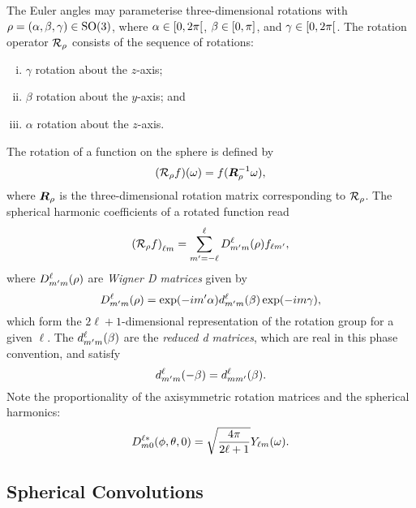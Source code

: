 The Euler angles may parameterise three-dimensional rotations with \(\rho = (\alpha,\beta,\gamma) \in \rotationGroup{}\), where \(\alpha \in \interval[open right]{0}{2\pi}\), \(\beta \in \interval{0}{\pi}\), and \(\gamma \in \interval[open right]{0}{2\pi}\).
The rotation operator \(\rotation{\rho}\) consists of the sequence of rotations:
%
\begin{enumerate}[(i),nosep]
	\item \({\gamma}\) rotation about the \(z\)-axis;
	\item \({\beta}\) rotation about the \(y\)-axis; and
	\item \({\alpha}\) rotation about the \(z\)-axis.
\end{enumerate}
%
The rotation of a function on the sphere is defined by
%
\begin{equation}
	\pixel{(\rotation{\rho}f)}
	= f(\vb*{R}_{\rho}^{-1} \omega),
\end{equation}
%
where \(\vb*{R}_{\rho}\) is the three-dimensional rotation matrix corresponding to \(\rotation{\rho}\).
The spherical harmonic coefficients of a rotated function read
%
\begin{equation}\label{eq:chapter3_rotation_matrix}
	\harmonic{(\rotation{\rho}f)}
	= \sum\limits_{m'=-\ell}^{\ell} \wigner{\ell}{m'}{m}(\rho) f_{\ell m'},
\end{equation}
%
where \(\wigner{\ell}{m'}{m}(\rho)\) are \emph{Wigner D matrices} given by
%
\begin{equation}\label{eq:chapter3_reduced_wigner_define}
	\wigner{\ell}{m'}{m}(\rho)
	= \exp(-i m'\alpha) \reducedWigner{\ell}{m'}{m}(\beta) \exp(-i m\gamma),
\end{equation}
%
which form the \(2\ell+1\)-dimensional representation of the rotation group for a given \({\ell}\).
The \(\reducedWigner{\ell}{m'}{m}(\beta)\) are the \emph{reduced d matrices}, which are real in this phase convention, and satisfy
%
\begin{equation}\label{eq:chapter3_reduced_wigner_symmetry}
	\reducedWigner{\ell}{m'}{m}(-\beta)
	= \reducedWigner{\ell}{m}{m'}(\beta).
\end{equation}
%
Note the proportionality of the axisymmetric rotation matrices and the spherical harmonics:
%
\begin{equation}\label{eq:chapter3_wigner_axisymmetric}
	\wigner[\ast]{\ell}{m}{0}(\phi,\theta,0)
	= \sqrt{\inverseFactor} \pixel{\harmonic{Y}}.
\end{equation}

\subsection{Spherical Convolutions}\label{sec:chapter3_spherical_convolutions}

